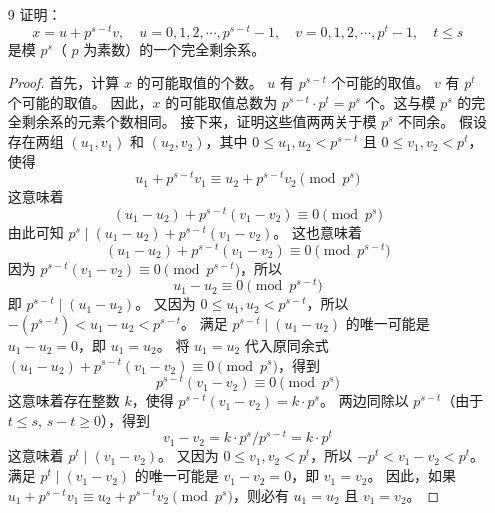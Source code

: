 \begin{enumerate}
\begin{proof}
\begin{enumerate}
\begin{align*}
                &= 1 + c \cdot 2^{k+3} + c^2 \cdot 2^{2(k+2)} \\
                &= 1 + c \cdot 2^{k+3} + c^2 \cdot 2^{2k+4}
            \end{align*}
            因为 $k \ge 1$，所以 $2k+4 = (k+3) + (k+1) \ge k+3+2 = k+5$。
            因此 $2^{k+3} \mid c^2 \cdot 2^{2k+4}$。
            故
            \[ a^{2^{k+1}} \equiv 1 + c \cdot 2^{k+3} \pmod{2^{k+3}} \]
            \[ a^{2^{k+1}} \equiv 1 \pmod{2^{k+3}} \]
            当 $n=k+1$ 时命题成立。
        \end{enumerate}
        由数学归纳法原理，原命题对所有 $n \ge 1$ 成立。
    \end{proof}
    \item[9] 证明：
    $$
    x=u+p^{s-t} v, \quad u=0,1,2, \cdots, p^{s-t}-1, \quad v=0,1,2, \cdots, p^t-1, \quad t \leqslant s
    $$
    是模 $p^s$（ $p$ 为素数）的一个完全剩余系。
    \begin{proof}
        首先，计算 $x$ 的可能取值的个数。
        $u$ 有 $p^{s-t}$ 个可能的取值。
        $v$ 有 $p^t$ 个可能的取值。
        因此，$x$ 的可能取值总数为 $p^{s-t} \cdot p^t = p^s$ 个。这与模 $p^s$ 的完全剩余系的元素个数相同。
        接下来，证明这些值两两关于模 $p^s$ 不同余。
        假设存在两组 $(u_1, v_1)$ 和 $(u_2, v_2)$，其中 $0 \le u_1, u_2 < p^{s-t}$ 且 $0 \le v_1, v_2 < p^t$，使得
        \[ u_1 + p^{s-t} v_1 \equiv u_2 + p^{s-t} v_2 \pmod{p^s} \]
        这意味着
        \[ (u_1 - u_2) + p^{s-t} (v_1 - v_2) \equiv 0 \pmod{p^s} \]
        由此可知 $p^s \mid (u_1 - u_2) + p^{s-t} (v_1 - v_2)$。
        这也意味着
        \[ (u_1 - u_2) + p^{s-t} (v_1 - v_2) \equiv 0 \pmod{p^{s-t}} \]
        因为 $ p^{s-t} (v_1 - v_2) \equiv 0 \pmod{p^{s-t}}$，所以
        \[ u_1 - u_2 \equiv 0 \pmod{p^{s-t}} \]
        即 $p^{s-t} \mid (u_1 - u_2)$。
        又因为 $0 \le u_1, u_2 < p^{s-t}$，所以 $-(p^{s-t}) < u_1 - u_2 < p^{s-t}$。
        满足 $p^{s-t} \mid (u_1 - u_2)$ 的唯一可能是 $u_1 - u_2 = 0$，即 $u_1 = u_2$。
        将 $u_1 = u_2$ 代入原同余式 $(u_1 - u_2) + p^{s-t} (v_1 - v_2) \equiv 0 \pmod{p^s}$，得到
        \[ p^{s-t} (v_1 - v_2) \equiv 0 \pmod{p^s} \]
        这意味着存在整数 $k$，使得 $p^{s-t} (v_1 - v_2) = k \cdot p^s$。
        两边同除以 $p^{s-t}$（由于 $t \le s$, $s-t \ge 0$），得到
        \[ v_1 - v_2 = k \cdot p^s / p^{s-t} = k \cdot p^t \]
        这意味着 $p^t \mid (v_1 - v_2)$。
        又因为 $0 \le v_1, v_2 < p^t$，所以 $-p^t < v_1 - v_2 < p^t$。
        满足 $p^t \mid (v_1 - v_2)$ 的唯一可能是 $v_1 - v_2 = 0$，即 $v_1 = v_2$。
        因此，如果 $u_1 + p^{s-t} v_1 \equiv u_2 + p^{s-t} v_2 \pmod{p^s}$，则必有 $u_1 = u_2$ 且 $v_1 = v_2$。

\end{proof}
\end{enumerate}
